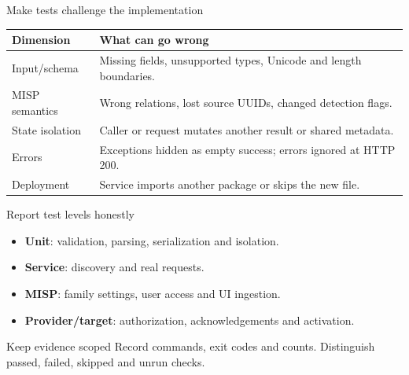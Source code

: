 \begin{frame}{Make tests challenge the implementation}
    \small
    \begin{tabular}{@{}P{3.5cm}P{6.7cm}@{}}
        \toprule
        Dimension & What can go wrong \\
        \midrule
        Input/schema & Missing fields, unsupported types, Unicode and length boundaries. \\
        MISP semantics & Wrong relations, lost source UUIDs, changed detection flags. \\
        State isolation & Caller or request mutates another result or shared metadata. \\
        Errors & Exceptions hidden as empty success; errors ignored at HTTP 200. \\
        Deployment & Service imports another package or skips the new file. \\
        \bottomrule
    \end{tabular}
\end{frame}

\begin{frame}{Report test levels honestly}
    \begin{itemize}
        \item \textbf{Unit}: validation, parsing, serialization and isolation.
        \item \textbf{Service}: discovery and real  requests.
        \item \textbf{MISP}: family settings, user access and UI ingestion.
        \item \textbf{Provider/target}: authorization, acknowledgements and activation.
    \end{itemize}
    \begin{block}{Keep evidence scoped}
        Record commands, exit codes and counts.
        Distinguish passed, failed, skipped and unrun checks.
    \end{block}
\end{frame}


